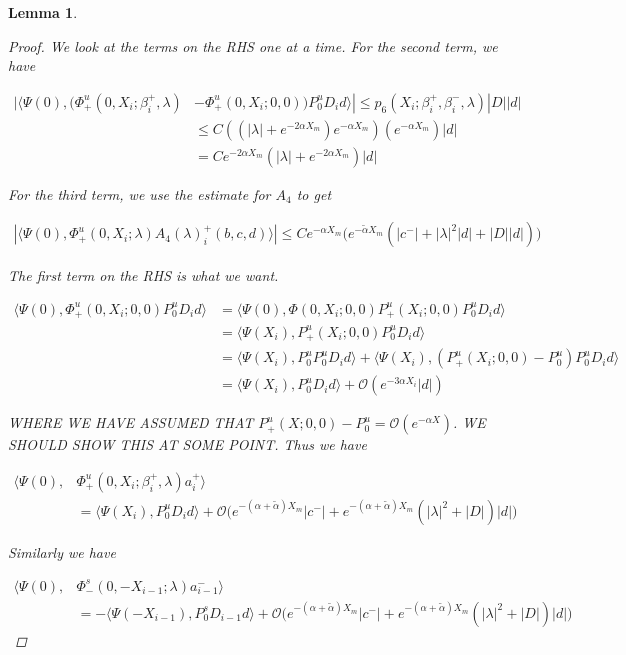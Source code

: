 \documentclass[12pt]{article}
\newtheorem{lemma}{Lemma}
\begin{document}
\begin{lemma}
\begin{proof}
We look at the terms on the RHS one at a time. For the second term, we have

\begin{align*}
|\langle \Psi(0), (\Phi^u_+(0, X_i; \beta_i^+, \lambda) &- \Phi^u_+(0, X_i; 0, 0)) P^u_0 D_i d \rangle| \leq p_6(X_i; \beta_i^+, \beta_i^-, \lambda)|D||d| \\
&\leq C( ( |\lambda| + e^{-2 \alpha X_m} ) e^{-\alpha X_m})(e^{-\alpha X_m})|d| \\
&=C e^{-2 \alpha X_m}(|\lambda| + e^{-2 \alpha X_m})|d|
\end{align*}

For the third term, we use the estimate for $A_4$ to get

\begin{align*}
|\langle \Psi(0), \Phi^u_+(0, X_i; \lambda) A_4(\lambda)_i^+(b,c,d) \rangle| 
\leq C e^{-\alpha X_m}\Big( e^{-\tilde{\alpha}X_m}( |c^-| + |\lambda|^2 |d| + |D||d| ) \Big)
\end{align*}

The first term on the RHS is what we want.

\begin{align*}
\langle \Psi(0), \Phi^u_+(0, X_i; 0, 0) P^u_0 D_i d \rangle &= \langle \Psi(0), \Phi(0, X_i; 0, 0) P^u_+(X_i; 0, 0) P^u_0 D_i d \rangle \\
&= \langle \Psi(X_i), P^u_+(X_i; 0, 0) P^u_0 D_i d \rangle \\
&= \langle \Psi(X_i), P^u_0 P^u_0 D_i d \rangle + \langle \Psi(X_i), (P^u_+(X_i; 0, 0) - P^u_0) P^u_0 D_i d \rangle \\
&= \langle \Psi(X_i), P^u_0 D_i d \rangle + \mathcal{O}(e^{-3 \alpha X_i}|d|)
\end{align*}

WHERE WE HAVE ASSUMED THAT $P^u_+(X; 0, 0) - P^u_0 = \mathcal{O}(e^{-\alpha X})$. WE SHOULD SHOW THIS AT SOME POINT. Thus we have

\begin{align*}
\langle \Psi(0), &\Phi^u_+(0, X_i; \beta_i^+, \lambda) a_i^+ \rangle \\
&= \langle \Psi(X_i), P^u_0 D_i d \rangle + \mathcal{O}\Big( e^{-(\alpha + \tilde{\alpha})X_m} |c^-| 
+ e^{-(\alpha + \tilde{\alpha})X_m}(|\lambda|^2 + |D| )|d| \Big)
\end{align*}

Similarly we have

\begin{align*}
\langle \Psi(0), &\Phi^s_-(0, -X_{i-1}; \lambda)a_{i-1}^- \rangle \\
&= -\langle \Psi(-X_{i-1}), P^s_0 D_{i-1} d \rangle
+ \mathcal{O}\Big( e^{-(\alpha + \tilde{\alpha})X_m} |c^-| 
+ e^{-(\alpha + \tilde{\alpha})X_m}(|\lambda|^2 + |D| )|d| \Big)
\end{align*}


\end{proof}
\end{lemma}
\end{document}
